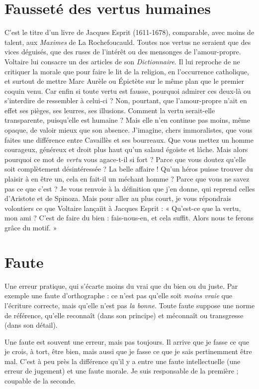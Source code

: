 \section{Fausseté des vertus humaines}
C’est le titre d’un livre de Jacques
Esprit (1611-1678), comparable,
avec moins de talent, aux {\it Maximes} de La Rochefoucauld. Toutes nos vertus ne
seraient que des vices déguisés, que des ruses de l'intérêt ou des mensonges de
l'amour-propre. Voltaire lui consacre un des articles de son {\it Dictionnaire}. Il lui
reproche de ne critiquer la morale que pour faire le lit de la religion, en l’occurrence
catholique, et surtout de mettre Marc Aurèle ou Épictète sur le même
plan que le premier coquin venu. Car enfin si toute vertu est fausse, pourquoi
admirer ces deux-là ou s’interdire de ressembler à celui-ci ? Non, pourtant, que
l'amour-propre n’ait en effet ses pièges, ses leurres, ses illusions. Comment la
vertu serait-elle transparente, puisqu’elle est humaine ? Mais elle n’en continue
pas moins, même opaque, de valoir mieux que son absence. J'imagine, chers
immoralistes, que vous faites une différence entre Cavaillès et ses bourreaux.
Que vous mettez un homme courageux, généreux et droit plus haut qu’un
salaud égoïste et lâche. Mais alors pourquoi ce mot de {\it vertu} vous agace-t-il si
fort ? Parce que vous doutez qu’elle soit complètement désintéressée ? La belle
affaire ! Qu’un héros puisse trouver du plaisir à en être un, cela en fait-il un
méchant homme ? Parce que vous ne savez pas ce que c’est ? Je vous renvoie à
la définition que j’en donne, qui reprend celles d’Aristote et de Spinoza. Mais
pour aller au plus court, je vous répondrais volontiers ce que Voltaire lançaïit à
Jacques Esprit : « Qu'est-ce que la vertu, mon ami ? C’est de faire du bien :
fais-nous-en, et cela suffit. Alors nous te ferons grâce du motif. »

\section{Faute}
Une erreur pratique, qui s’écarte moins du vrai que du bien ou du
juste. Par exemple une faute d'orthographe : ce n’est pas qu’elle soit
{\it moins vraie} que l'écriture correcte, mais qu’elle n’est pas {\it la bonne}. Toute faute
suppose une norme de référence, qu’elle reconnaît (dans son principe) et
méconnaît ou transgresse (dans son détail).

Une faute est souvent une erreur, mais pas toujours. Il arrive que je fasse ce
que je crois, à tort, être bien, mais aussi que je fasse ce que je sais pertinemment
être mal. C’est à peu près la différence qu’il y a entre une faute intellectuelle
(une erreur de jugement) et une faute morale. Je suis responsable de la
première ; coupable de la seconde.


